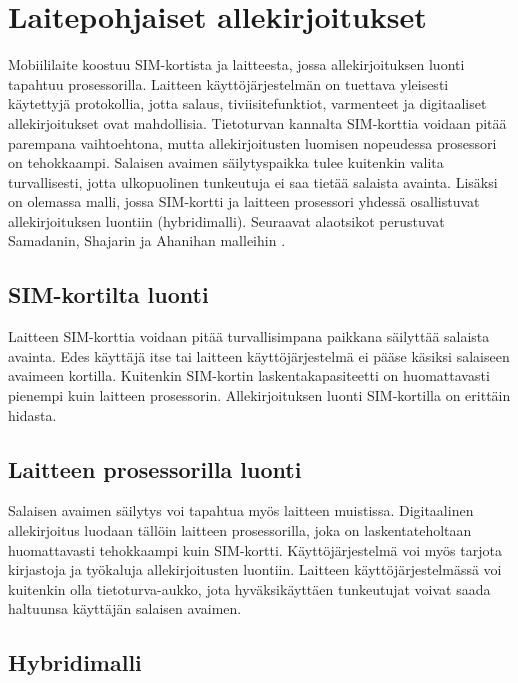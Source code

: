 \documentclass[finnish]{tktltiki2}
\theoremstyle{definition}
\theoremstyle{remark}
\begin{document}
\section{Laitepohjaiset allekirjoitukset}

Mobiililaite koostuu SIM-kortista ja laitteesta, jossa allekirjoituksen luonti tapahtuu prosessorilla. Laitteen käyttöjärjestelmän on tuettava yleisesti käytettyjä protokollia, jotta salaus, tiviisitefunktiot, varmenteet ja digitaaliset allekirjoitukset ovat mahdollisia. Tietoturvan kannalta SIM-korttia voidaan pitää parempana vaihtoehtona, mutta allekirjoitusten luomisen nopeudessa prosessori on tehokkaampi. Salaisen avaimen säilytyspaikka tulee kuitenkin valita turvallisesti, jotta ulkopuolinen tunkeutuja ei saa tietää salaista avainta. Lisäksi on olemassa malli, jossa SIM-kortti ja laitteen prosessori yhdessä osallistuvat allekirjoituksen luontiin (hybridimalli). Seuraavat alaotsikot perustuvat Samadanin, Shajarin ja Ahanihan malleihin \cite{proxy}. 
 
\subsection{SIM-kortilta luonti}

Laitteen SIM-korttia voidaan pitää turvallisimpana paikkana säilyttää salaista avainta. Edes käyttäjä itse tai laitteen käyttöjärjestelmä ei pääse käsiksi salaiseen avaimeen kortilla. Kuitenkin SIM-kortin laskentakapasiteetti on huomattavasti pienempi kuin laitteen prosessorin. Allekirjoituksen luonti SIM-kortilla on erittäin hidasta.   

\subsection{Laitteen prosessorilla luonti}

Salaisen avaimen säilytys voi tapahtua myös laitteen muistissa. Digitaalinen allekirjoitus luodaan tällöin laitteen prosessorilla, joka on laskentateholtaan huomattavasti tehokkaampi kuin SIM-kortti. Käyttöjärjestelmä voi myös tarjota kirjastoja ja työkaluja allekirjoitusten luontiin. Laitteen käyttöjärjestelmässä voi kuitenkin olla tietoturva-aukko, jota hyväksikäyttäen tunkeutujat voivat saada haltuunsa käyttäjän salaisen avaimen.

\subsection{Hybridimalli}
\end{document}
